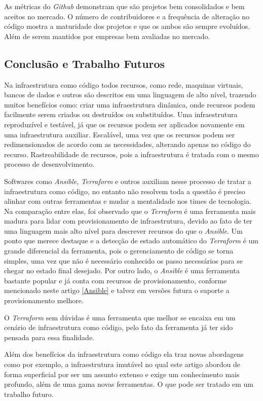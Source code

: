 As métricas do \textit{Github} demonstram que são projetos bem consolidados e bem aceitos no mercado. O número de contribuidores e a frequência de alteração no código mostra a maturidade dos projetos e que os ambos são sempre evoluídos. Além de serem mantidos por empresas bem avaliadas no mercado.  

\subsection{Conclusão e Trabalho Futuros}
Na infraestrutura como código todos recursos, como rede, maquinas virtuais, bancos de dados e outros são descritos em uma linguagem de alto nível, trazendo muitos benefícios como: criar uma infraestrutura dinâmica, onde recursos podem facilmente serem criados ou destruídos ou substituídos. Uma infraestrutura reproduzível e testável, já que os recursos podem ser aplicados novamente em uma infraestrutura auxiliar. Escalável, uma vez que os recursos podem ser redimensionados de acordo com as necessidades, alterando apenas no código do recurso. Rastreabilidade de recursos, pois a infraestrutura é tratada com o mesmo processo de desenvolvimento. 

Softwares como \textit{Ansible}, \textit{Terraform} e outros auxiliam nesse processo de tratar a infraestrutura como código, no entanto não resolvem toda a questão é preciso alinhar com outras ferramentas e mudar a mentalidade nos times de tecnologia. Na comparação entre elas, foi observado que o \textit{Terraform} é uma ferramenta mais madura para lidar com provisionamento de infraestrutura, devido ao fato de ter uma linguagem mais alto nível para descrever recursos do que o \textit{Ansible}. Um ponto que merece destaque e a detecção de estado automático do \textit{Terraform} é um grande diferencial da ferramenta, pois o gerenciamento de código se torna simples, uma vez que não é necessário conhecido os passo necessários para se chegar no estado final desejado. Por outro lado, o \textit{Ansible} é uma ferramenta bastante popular e já conta com recursos de provisionamento, conforme mencionado neste artigo \ref{Ansible} e talvez em versões futura o suporte a provisionamento melhore. 

O \textit{Terraform} sem dúvidas é uma ferramenta que melhor se encaixa em um cenário de infraestrutura como código, pelo fato da ferramenta já ter sido pensada para essa finalidade. 

Além dos benefícios da infraestrutura como código ela traz novas abordagens como por exemplo, a infraestrutura imutável no qual este artigo abordou de forma superficial por ser um assunto extenso e exige um conhecimento mais profundo, além de uma gama novas ferramentas. O que pode ser tratado em um trabalho futuro. 
